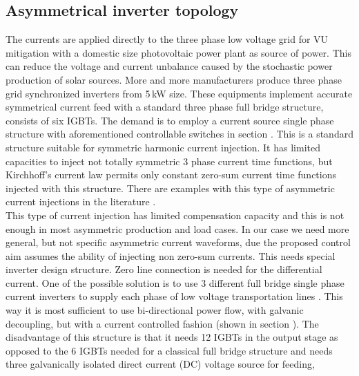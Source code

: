     \subsection{Asymmetrical inverter topology}\label{VUB:sec:Inverter}

     The currents are applied directly to the three phase low voltage grid for VU mitigation with a domestic size photovoltaic power plant  as source of power. This can reduce the voltage and current unbalance caused by the stochastic power production of solar sources. More and more manufacturers produce three phase grid synchronized inverters from 5\,kW size. These equipments implement accurate symmetrical current feed with a standard three phase full bridge structure, consists of six IGBTs. The demand is to employ a current source single phase structure with aforementioned controllable switches in section . This is a standard structure suitable for symmetric harmonic current injection. It has limited capacities to inject not totally symmetric 3 phase current time functions, but Kirchhoff's current law permits only constant zero-sum current time functions injected with this structure. There are examples with this type of asymmetric current injections in the literature \cite{lee2009new}.\\
    This type of current injection has limited compensation capacity and this is not enough in most asymmetric production and load cases. In our case we need more general, but not specific  asymmetric current waveforms, due the proposed control aim assumes the ability of injecting non zero-sum currents. This needs special inverter design structure. Zero line connection is needed for the differential current. One of the possible solution is to use 3 different full bridge single phase current inverters to supply each phase of low voltage transportation lines \cite{Patnaik2013topologies}. This way it is most sufficient to use bi-directional power flow, with galvanic decoupling, but with a current controlled fashion (shown in section ).  The disadvantage of this structure is that it needs 12 IGBTs in the output stage as opposed to the 6 IGBTs needed for a classical full bridge structure and needs three galvanically isolated direct current (DC) voltage source for feeding, \\
